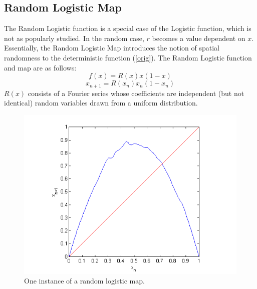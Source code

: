 \documentclass[12pt]{article}
\begin{document}
\subsection{Random Logistic Map}
The Random Logistic function is a special case of the Logistic
function, which is not as popularly studied. In the random case, $r$ becomes a value dependent on $x$. Essentially, the Random Logistic
Map introduces the notion of spatial randomness to the deterministic
function (\ref{orig}). The Random Logistic function and map are as follows:
\begin{equation*}
f(x) = R(x)x(1-x)
\end{equation*}
\begin{equation}\label{randmap}
x_{n+1} = R(x_n)x_n(1-x_n)
\end{equation}
$R(x)$ consists of a Fourier series whose coefficients are independent
(but not identical) random variables drawn from a uniform
distribution. 
\begin{figure}[H]
	\begin{center}
		\includegraphics[scale=0.7]{random_cobweb}
\caption{One instance of a random logistic map.}
	\end{center}
\end{figure}
\end{document}
